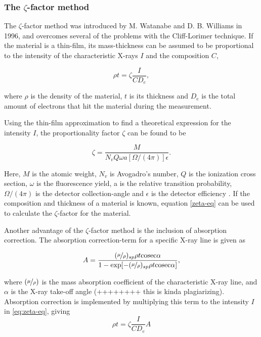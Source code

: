 		\subsubsection{The $\zeta$-factor method}
The $\zeta$-factor method was introduced by M. Watanabe and D. B. Williams in 1996, and overcomes several of the problems with the Cliff-Lorimer technique. If the material is a thin-film, its mass-thickness can be assumed to be proportional to the intensity of the characteristic X-rays $I$ and the composition $C$,

\begin{equation}
\label{eq:zeta-eq}
\rho t = \zeta \frac{I}{C D_e},
\end{equation}

where $\rho$ is the density of the material, $t$ is its thickness and $D_e$ is the total amount of electrons that hit the material during the measurement. 

Using the thin-film approximation to find a theoretical expression for the intensity $I$, the proportionality factor $\zeta$ can be found to be

\begin{equation}
\label{eq:zeta= }
\zeta = \dfrac{M}{N_v Q \omega a [\Omega/(4\pi)]\epsilon}.
\end{equation}

Here, $M$ is the atomic weight, $N_v$ is Avogadro's number, $Q$ is the ionization cross section, $\omega$ is the fluorescence yield, a is the relative transition probability, $\Omega/(4\pi)$ is the detector collection-angle and $\epsilon$ is the detector efficiency \cite{zeta-method}. If the composition and thickness of a material is known, equation \eqref{zeta-eq} can be used to calculate the $\zeta$-factor for the material.

Another advantage of the $\zeta$-factor method is the inclusion of absorption correction. The absorption correction-term for a specific X-ray line is given as

\begin{equation}
A = \frac{(\nicefrac{\mu}{\rho})_{sp}\rho t \mathrm{cosec} \alpha}{1-\exp[-(\nicefrac{\mu}{\rho})_{sp}\rho t \mathrm{cosec} \alpha]},
\label{eq:Abs-corr}
\end{equation}

where $(\nicefrac{\mu}{\rho})$ is the mass absorption coefficient of the characteristic X-ray line, and $\alpha$ is the X-ray take-off angle (++++++++ this is kinda plagiarizing). Absorption correction is implemented by multiplying this term to the intensity $I$ in \cref{eq:zeta-eq}, giving 
\begin{equation}
\rho t = \zeta \frac{I}{C D_e} A
\end{equation}

